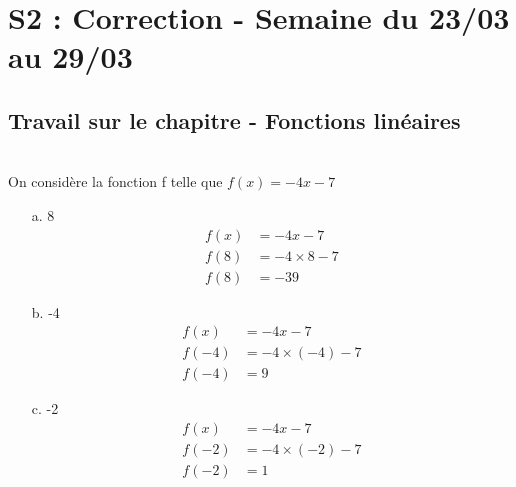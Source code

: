 \documentclass[11pt]{article}
\begin{document}

\newtheorem{Definition}{Définition}
\newtheorem{Theorem}{Théorème}
\newtheorem{Proposition}{Propriété}
\newtheorem{Exo}{Éxercice}

\renewcommand{\labelitemi}{$\bullet$}
\renewcommand{\labelitemii}{$\circ$}

\setlength{\columnseprule}{1pt}

\section*{S2 : Correction - Semaine du 23/03 au 29/03}

\subsection*{Travail sur le chapitre - Fonctions linéaires}

\\
On considère la fonction f telle que $f(x) = -4x - 7$

\begin{multicols}{3}
\begin{enumerate}
    \item[a.] 8
    \begin{align*}
        f(x) &= -4x - 7 \\
        f(8) &= -4 \times 8 - 7 \\
        f(8) &= -39  
    \end{align*}\columnbreak

    \item[b.]  -4
    \begin{align*}
        f(x) &= -4x - 7 \\
        f(-4) &= -4 \times (-4) - 7 \\
        f(-4) &= 9
    \end{align*}\columnbreak

    \item[c.]  -2
    \begin{align*}
        f(x) &= -4x - 7 \\
        f(-2) &= -4 \times (-2) - 7 \\
        f(-2) &= 1
    \end{align*}

\end{enumerate}
 \end{multicols}
\end{document}
